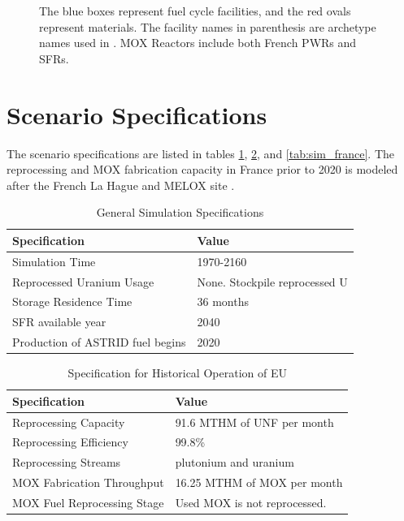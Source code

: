 \begin{figure}
{\begin{tikzpicture}[align=center, node distance = 3cm and 3cm, auto]
                \end{tikzpicture}
        
                }
                \caption{The blue boxes represent fuel cycle facilities, and the red ovals
                         represent materials. The facility names in parenthesis are archetype names
                         used in \Cyclus. \gls{MOX} Reactors include both French \glspl{PWR} and
                         \glspl{SFR}.}
                \label{diag:fc}
\end{figure}
\FloatBarrier

\section{Scenario Specifications}

The scenario specifications  are
listed in tables \ref{tab:gen}, \ref{tab:sim_eu}, and \ref{tab:sim_france}.
The reprocessing and \gls{MOX} fabrication capacity in France
prior to 2020 is modeled after the 
French La Hague and MELOX site \cite{schneider_spent_2008, hugelmann_melox_1999}.


\begin{table}[h]
    \centering
    \begin{tabularx}{\textwidth}{bb}
        \hline
        \textbf{Specification} &\textbf{ Value} \\
        \hline
        Simulation Time & 1970-2160 \\ 
        Reprocessed Uranium Usage &  None. Stockpile reprocessed U \\
        Storage Residence Time & 36 months \\
        \gls{SFR} available year & 2040 \\
        Production of \gls{ASTRID} fuel begins & 2020 \\
        \hline
    \end{tabularx}
    \caption {General Simulation Specifications}
    \label{tab:gen}
\end{table}

\begin{table}[h]
    \centering
    \begin{tabularx}{\textwidth}{bb}
        \hline
        \textbf{Specification} &\textbf{ Value} \\
        \hline
        Reprocessing Capacity & 91.6 MTHM of \gls{UNF} per month \cite{schneider_spent_2008} \\
        Reprocessing Efficiency & 99.8\% \\
        Reprocessing Streams & plutonium and uranium \\
        \gls{MOX} Fabrication Throughput & 16.25 MTHM of \gls{MOX} per month  \cite{hugelmann_melox_1999} \\
        \gls{MOX} Fuel Reprocessing Stage &  Used \gls{MOX} is not reprocessed. \\  
        \hline
    \end{tabularx}
    \caption {Specification for Historical Operation of \gls{EU}}
    \label{tab:sim_eu}
\end{table}

